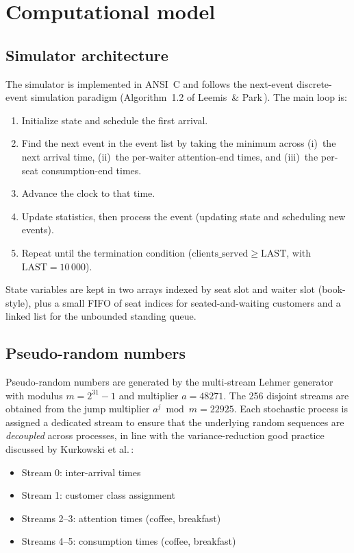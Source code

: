 \documentclass[11pt,a4paper]{article}
\begin{document}
\section{Computational model}

\subsection{Simulator architecture}
The simulator is implemented in ANSI~C and follows the next-event
discrete-event simulation paradigm (Algorithm~1.2 of
Leemis~\& Park\,\cite{leemis_park}). The main loop is:

\begin{enumerate}
\item Initialize state and schedule the first arrival.
\item Find the next event in the event list by taking the minimum
across (i)~the next arrival time, (ii)~the per-waiter attention-end
times, and (iii)~the per-seat consumption-end times.
\item Advance the clock to that time.
\item Update statistics, then process the event (updating state and
scheduling new events).
\item Repeat until the termination condition
($\text{clients\_served} \ge \mathrm{LAST}$, with $\mathrm{LAST}=10\,000$).
\end{enumerate}

State variables are kept in two arrays indexed by seat slot and
waiter slot (book-style), plus a small FIFO of seat indices for
seated-and-waiting customers and a linked list for the unbounded
standing queue.

\subsection{Pseudo-random numbers}
Pseudo-random numbers are generated by the multi-stream Lehmer
generator with modulus $m = 2^{31}-1$ and multiplier $a = 48271$.
The 256 disjoint streams are obtained from the jump multiplier
$a^{j} \bmod m = 22925$. Each stochastic process is assigned a
dedicated stream to ensure that the underlying random sequences are
\emph{decoupled} across processes, in line with the variance-reduction
good practice discussed by Kurkowski et al.\,\cite{kurkowski_manet}:

\begin{itemize}
\item Stream 0: inter-arrival times
\item Stream 1: customer class assignment
\item Streams 2--3: attention times (coffee, breakfast)
\item Streams 4--5: consumption times (coffee, breakfast)
\end{itemize}
\end{document}
